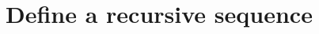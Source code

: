 \documentclass{article}
\newcommand{\YearPath}{../../../LatexConfig} %
\newcommand{\SemesterPath}{../../LatexConfig} %
\newcommand{\ClassPath}{../LatexConfig} %
\begin{document}




\section{Define a recursive sequence}

\end{document}
